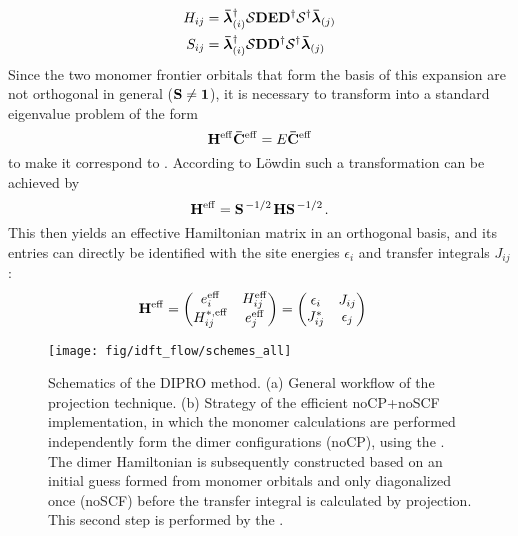  \begin{equation}
  \begin{aligned}
     H_{ij} &= \mathbf{ \bar{\boldsymbol{\lambda}} }_{(i)}^\dagger \mathbf{ \mathcal{S} } \mathbf{ D } \mathbf{ E } \mathbf{ D }^\dagger \mathbf{ \mathcal{S} }^\dagger \mathbf{ \bar{\boldsymbol{\lambda}} }_{(j)}  \\
     S_{ij} &= \mathbf{ \bar{\boldsymbol{\lambda}} }_{(i)}^\dagger \mathbf{ \mathcal{S} } \mathbf{ D }  \mathbf{ D }^\dagger \mathbf{ \mathcal{S} }^\dagger \mathbf{ \bar{\boldsymbol{\lambda}} }_{(j)} 
  \end{aligned}
   \label{eq:dipro_eq20}
 \end{equation}
%
Since the two monomer frontier orbitals that form the basis of this expansion are not orthogonal in general ($\mathbf{ S } \neq \mathbf{ 1 }$), it is necessary to transform  into a standard eigenvalue problem of the form
%
\begin{equation}
  \mathbf{ H }^{\mathrm{eff}} \mathbf{ \bar{C} }^{\mathrm{eff}} =   E \mathbf{ \bar{C} }^{\mathrm{eff}} 
  \label{eq:dipro_eq7}
\end{equation}
%
to make it correspond to . According to L\"owdin such a transformation can be achieved by
%
\begin{equation}
  \mathbf{ H^\mathrm{eff} } = \mathbf{ S }^{\left. {-1} \middle/ {2} \right.}
  \mathbf{ H }\mathbf{ S }^{\left. {-1} \middle/ {2} \right.}.
  \label{eq:dipro_eq9}
\end{equation}
%
This then yields an effective Hamiltonian matrix in an orthogonal basis, and its entries can directly be identified with the site energies $\epsilon_i$ and transfer integrals $J_{ij}$:
%
\begin{equation}
 \begin{aligned}
  \mathbf{ H }^{\mathrm{eff}} &= 
    \begin{pmatrix}
      e_i^{\mathrm{eff}}    &  H_{ij}^\mathrm{eff} \\
      H_{ij}^{*,\mathrm{eff}}   &  e_j^\mathrm{eff}  
    \end{pmatrix} =
    \begin{pmatrix}
      \epsilon_i    &  J_{ij} \\
      J_{ij}^*      &  \epsilon_j  
    \end{pmatrix} 
 \end{aligned}
  \label{eq:dipro_eq11}
\end{equation}

 \begin{figure}[htb]
     \center
     \texttt{[image: fig/idft\_flow/schemes\_all]}
     \caption{Schematics of the DIPRO method. (a) General workflow of the projection technique. (b) Strategy of the efficient noCP+noSCF implementation, in which the monomer calculations are performed independently form the dimer configurations (noCP), using the  \calculator. The dimer Hamiltonian is subsequently constructed based on an initial guess formed from monomer orbitals and only diagonalized once (noSCF) before the transfer integral is calculated by projection. This second step is performed by the  \calculator. }
     \label{fig:dipro_scheme}
 \end{figure}

